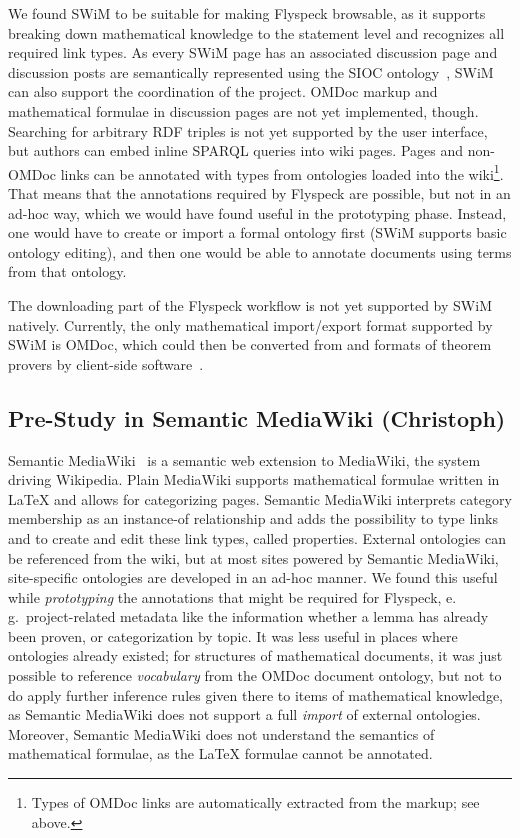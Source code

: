 \documentclass{llncs}
\begin{document}
We found SWiM to be suitable for making Flyspeck browsable, as it supports breaking down
mathematical knowledge to the statement level and recognizes all required link types.  As
every SWiM page has an associated discussion page and discussion posts are semantically
represented using the SIOC ontology~\cite{SIOC:web}, SWiM can also support the
coordination of the project.  OMDoc markup and mathematical formulae in discussion pages
are not yet implemented, though.  Searching for arbitrary RDF triples is not yet supported
by the user interface, but authors can embed inline SPARQL queries into wiki pages.  Pages
and non-OMDoc links can be annotated with types from ontologies loaded into the
wiki\footnote{Types of OMDoc links are automatically extracted from the markup; see
  above.}.  That means that the annotations required by Flyspeck are possible, but not in
an ad-hoc way, which we would have found useful in the prototyping phase.  Instead, one
would have to create or import a formal ontology first (SWiM supports basic ontology
editing), and then one would be able to annotate documents using terms from that ontology.

The downloading part of the Flyspeck workflow is not yet supported by SWiM natively.
Currently, the only mathematical import/export format supported by SWiM is OMDoc, which
could then be converted from and formats of theorem provers by client-side
software~\cite[chap.\ 25.2]{Kohlhase:omdoc1.2}.

\subsection{Pre-Study in Semantic MediaWiki (Christoph)}
\label{sec:smw-study}

Semantic MediaWiki~\cite{KrSchVr:semwiki-reasoning07} is a semantic web extension to
MediaWiki, the system driving Wikipedia.  Plain MediaWiki supports mathematical formulae
written in {\LaTeX} and allows for categorizing pages.  Semantic MediaWiki interprets
category membership as an instance-of relationship and adds the possibility to type links
and to create and edit these link types, called properties.  External ontologies can be
referenced from the wiki, but at most sites powered by Semantic MediaWiki, site-specific
ontologies are developed in an ad-hoc manner.  We found this useful while
\emph{prototyping} the annotations that might be required for Flyspeck, e.\,g.\
project-related metadata like the information whether a lemma has already been proven, or
categorization by topic.  It was less useful in places where ontologies already existed;
for structures of mathematical documents, it was just possible to reference
\emph{vocabulary} from the OMDoc document ontology, but not to do apply further inference
rules given there to items of mathematical knowledge, as Semantic MediaWiki does not
support a full \emph{import} of external ontologies.  Moreover, Semantic MediaWiki does
not understand the semantics of mathematical formulae, as the {\LaTeX} formulae cannot be
annotated.
\end{document}
